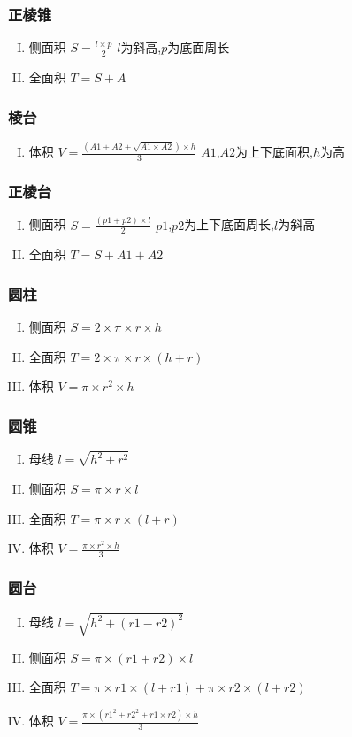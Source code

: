 \subsubsection{正棱锥}
\begin{enumerate}[I. ]
	\item 侧面积 $S=\frac{l\times p}{2}$ $l$为斜高,$p$为底面周长
	\item 全面积 $T=S+A$
\end{enumerate}
\subsubsection{棱台}
\begin{enumerate}[I. ]
	\item 体积 $V=\frac{(A1+A2+\sqrt{A1\times A2})\times h}{3}$ $A1$,$A2$为上下底面积,$h$为高
\end{enumerate}
\subsubsection{正棱台}
\begin{enumerate}[I. ]
	\item 侧面积 $S=\frac{(p1+p2)\times l}{2}$ $p1$,$p2$为上下底面周长,$l$为斜高
	\item 全面积 $T=S+A1+A2$
\end{enumerate}
\subsubsection{圆柱}
\begin{enumerate}[I. ]
	\item 侧面积 $S=2\times \pi \times r \times h$
	\item 全面积 $T=2\times \pi \times r \times (h+r)$
	\item 体积 $V=\pi \times r^{2} \times h$
\end{enumerate}
\subsubsection{圆锥}
\begin{enumerate}[I. ]
	\item 母线 $l=\sqrt{h^{2}+r^{2}}$
	\item 侧面积 $S=\pi\times r\times l$
	\item 全面积 $T=\pi\times r\times (l+r)$
	\item 体积 $V=\frac{\pi\times r^{2}\times h}{3}$
\end{enumerate}
\subsubsection{圆台}
\begin{enumerate}[I. ]
	\item 母线 $l=\sqrt{h^{2}+(r1-r2)^{2}}$
	\item 侧面积 $S=\pi\times (r1+r2)\times l$
	\item 全面积 $T=\pi\times r1\times (l+r1)+\pi\times r2\times (l+r2)$
	\item 体积 $V=\frac{\pi\times (r1^{2}+r2^{2}+r1\times r2)\times h}{3}$
\end{enumerate}
